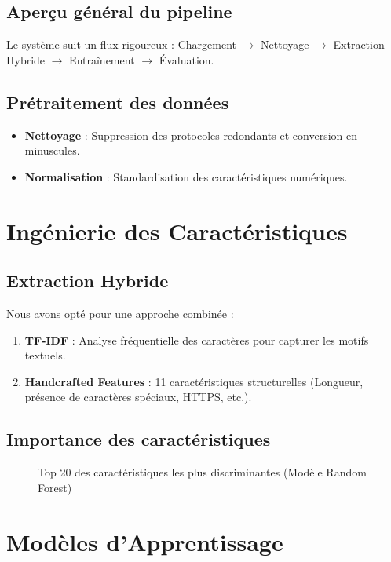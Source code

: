 \documentclass[12pt,a4paper]{article}
\begin{document}
\subsection{Aperçu général du pipeline}
Le système suit un flux rigoureux : Chargement $\rightarrow$ Nettoyage $\rightarrow$ Extraction Hybride $\rightarrow$ Entraînement $\rightarrow$ Évaluation.

\subsection{Prétraitement des données}
\begin{itemize}
    \item \textbf{Nettoyage} : Suppression des protocoles redondants et conversion en minuscules.
    \item \textbf{Normalisation} : Standardisation des caractéristiques numériques.
\end{itemize}

\section{Ingénierie des Caractéristiques}
\subsection{Extraction Hybride}
Nous avons opté pour une approche combinée :
\begin{enumerate}
    \item \textbf{TF-IDF} : Analyse fréquentielle des caractères pour capturer les motifs textuels.
    \item \textbf{Handcrafted Features} : 11 caractéristiques structurelles (Longueur, présence de caractères spéciaux, HTTPS, etc.).
\end{enumerate}

\subsection{Importance des caractéristiques}
\begin{figure}[H]
    \centering
    \caption{Top 20 des caractéristiques les plus discriminantes (Modèle Random Forest)}
\end{figure}

\section{Modèles d’Apprentissage}
\end{document}
